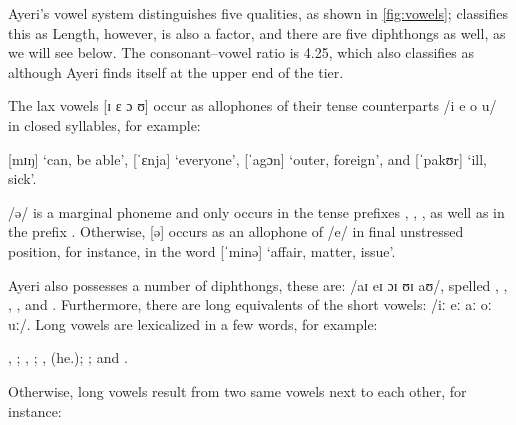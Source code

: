 Ayeri's vowel system distinguishes five qualities, as shown in 
\autoref{fig:vowels}; \citet{wals2} classifies this as 
Length, however, is also a factor, and there are five diphthongs as well, as we 
will see below. The consonant--vowel ratio is 4.25, which \citet{wals3} also 
classifies as  although Ayeri finds itself at the upper 
end of the tier.

The lax vowels [ɪ ɛ ɔ ʊ] occur as allophones of their tense counterparts 
/i e o u/ in closed syllables, for example:

\pex
	\a {} [mɪŋ] `can, be able',
	\a {} [ˈɛnja] `everyone',
	\a {} [ˈagɔn] `outer, foreign', and
	\a {} [ˈpakʊr] `ill, sick'.
\xe

/ə/ is a marginal phoneme and only occurs in the tense prefixes 
, , , as 
well as in the prefix . Otherwise, [ə] occurs 
as an allophone of /e/ in final unstressed position, for instance, in the word 
 [ˈminə] `affair, matter, issue'.

Ayeri also possesses a number of diphthongs, these are: /aɪ eɪ ɔɪ ʊɪ aʊ/, 
spelled , , , , and .
Furthermore, there are long equivalents of the short vowels: /iː eː aː oː uː/. 
Long vowels are lexicalized in a few words, for example:

\pex
	\a {}, ;
	\a {}, ;
	\a {},  (he.\Aarg{}); \label{ex:laa}
	\a {}; and 
	\a {}.\footnotemark
\xe


\noindent Otherwise, long vowels result from two same vowels next to each other, 
for instance:

